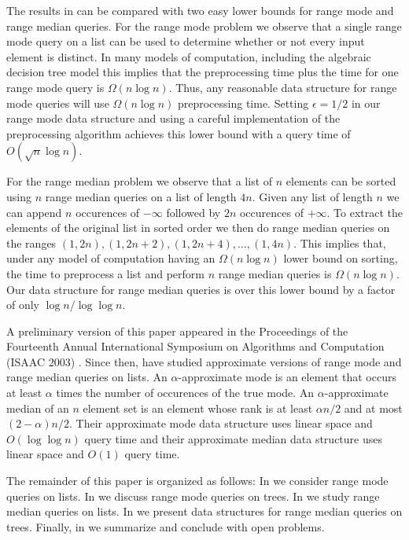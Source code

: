 \documentclass{njcarticle}
\begin{document}
The results in  can be compared with two easy lower
bounds for range mode and range median queries.  For the range mode
problem we observe that a single range mode query on a list can be
used to determine whether or not every input element is distinct.  In
many models of computation, including the algebraic decision tree
model  this implies that the preprocessing time plus the
time for one range mode query is $\Omega(n\log n)$.  Thus, any
reasonable data structure for range mode queries will use
$\Omega(n\log n)$ preprocessing time.  Setting $\epsilon=1/2$ in our
range mode data structure and using a careful implementation of the
preprocessing algorithm achieves this lower bound with a query
time of $O(\sqrt{n}\log n)$.

For the range median problem we observe that a list of $n$ elements
can be sorted using $n$ range median queries on a list of length $4n$.
Given any list of length $n$ we can append $n$ occurences of $-\infty$
followed by $2n$ occurences of $+\infty$.  To extract the elements of
the original list in sorted order we then do range median queries on
the ranges $(1,2n),(1,2n+2),(1,2n+4),\ldots,(1,4n)$.  This implies
that, under any model of computation having an $\Omega(n\log n)$ lower
bound on sorting, the time to preprocess a list and perform $n$ range
median queries is $\Omega(n\log n)$.  Our data structure for range
median queries is over this lower bound by a factor of only $\log
n/\log\log n$.

A preliminary version of this paper appeared in the Proceedings of the
Fourteenth Annual International Symposium on Algorithms and
Computation (ISAAC 2003) .  Since then,
\cite{bkmt05} have studied approximate
versions of range mode and range median queries on lists.  An
$\alpha$-approximate mode is an element that occurs at least $\alpha$
times the number of occurences of the true mode.  An
$\alpha$-approximate median of an $n$ element set is an element whose
rank is at least $\alpha n/2$ and at most $(2-\alpha)n/2$.  Their
approximate mode data structure uses linear space and $O(\log\log n)$
query time and their approximate median data structure uses linear
space and $O(1)$ query time.

The remainder of this paper is organized as follows:  In  we
consider range mode queries on lists.  In  we discuss 
range mode queries on trees.  In  we study range median
queries on lists.  In  we present data structures for
range median queries on trees.  Finally, in  we summarize
and conclude with open problems.  
\end{document}

